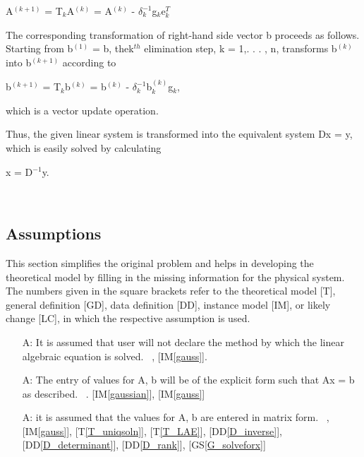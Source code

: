 \documentclass[12pt]{article}
\newcommand{\ddref}[1]{DD\ref{#1}}
\newcommand{\tref}[1]{T\ref{#1}}
\newcounter{assumpnum} %
\newcommand{\gsref}[1]{GS\ref{#1}}
\newcommand{\iref}[1]{IM\ref{#1}}
\begin{document}
{A$^{(k+1)}$ = {T$_k$}{A$^{(k)}$} = {A$^{(k)}$} -
$\delta_k^{-1}${g$_k$}{e$_k^T$}

The corresponding transformation of right-hand side vector b proceeds as
follows. Starting from {b$^{(1)}$} = b, the{k$^{th}$} elimination step, k = 1,.
. . , n, transforms {b$^{(k)}$} into {b$^{(k+1)}$} according to

{b$^{(k+1)}$} = {T$_k$}{b$^{(k)}$} = {b$^{(k)}$} -
$\delta_k^{-1}${b$^{(k)}_k$}{g$_k$},

which is a vector update operation. 

Thus, the given linear system is transformed into the equivalent system Dx = y,
which is easily solved by calculating

x = {D$^{-1}$}y.

~\newline

\subsection{Assumptions}

This section simplifies the original problem and helps in developing the
theoretical model by filling in the missing information for the physical
system. The numbers given in the square brackets refer to the theoretical model
[T], general definition [GD], data definition [DD], instance model [IM], or
likely change [LC], in which the respective assumption is used.

\begin{itemize}

\item[A\refstepcounter{assumpnum}\theassumpnum \label{A_programcall}:]
It is assumed that user will not declare the method by which the linear algebraic equation is solved.
~\newline
 [\iref{gaussian}], [\iref{gauss}].

\item[A\refstepcounter{assumpnum}\theassumpnum \label{A_explicit}:]
The entry of values for A, b will be of the explicit form such that Ax = b as described.
~\newline
 [\tref{T_LAE}]. [\iref{gaussian}], [\iref{gauss}]

\item[A\refstepcounter{assumpnum}\theassumpnum \label{A_matrixform}:]
it is assumed that the values for A, b are entered in matrix form.
~\newline
 [\iref{gaussian}], [\iref{gauss}], [\tref{T_uniqsoln}], [\tref{T_LAE}], [\ddref{D_inverse}], [\ddref{D_determinant}], [\ddref{D_rank}], [\gsref{G_solveforx}]


\end{itemize}}
\end{document}
